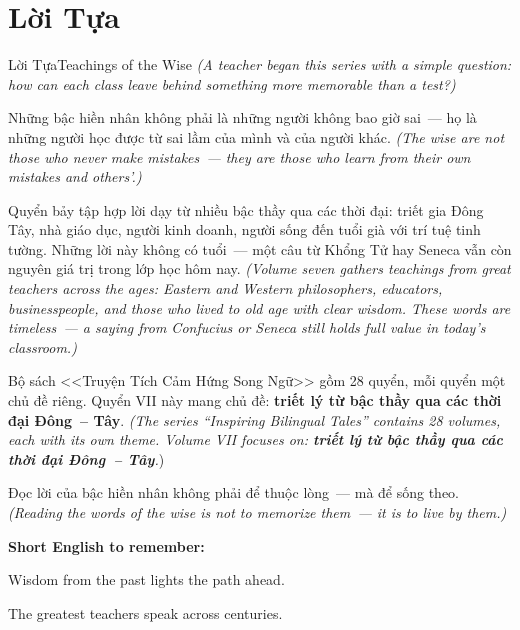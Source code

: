 \chapter*{Lời Tựa}

\begin{truyen}{Lời Tựa}{Teachings of the Wise}
\textit{(A teacher began this series with a simple question: how can each class leave behind something more memorable than a test?)}

Những bậc hiền nhân không phải là những người không bao giờ sai~--- họ là những người học được từ sai lầm của mình và của người khác.
\textit{(The wise are not those who never make mistakes~--- they are those who learn from their own mistakes and others'.)}

Quyển bảy tập hợp lời dạy từ nhiều bậc thầy qua các thời đại: triết gia Đông Tây, nhà giáo dục, người kinh doanh, người sống đến tuổi già với trí tuệ tinh tường. Những lời này không có tuổi~--- một câu từ Khổng Tử hay Seneca vẫn còn nguyên giá trị trong lớp học hôm nay.
\textit{(Volume seven gathers teachings from great teachers across the ages: Eastern and Western philosophers, educators, businesspeople, and those who lived to old age with clear wisdom. These words are timeless~--- a saying from Confucius or Seneca still holds full value in today's classroom.)}

Bộ sách <<Truyện Tích Cảm Hứng Song Ngữ>> gồm 28 quyển, mỗi quyển một chủ đề riêng. Quyển VII này mang chủ đề: \textbf{triết lý từ bậc thầy qua các thời đại Đông~-- Tây}.
\textit{(The series ``Inspiring Bilingual Tales'' contains 28 volumes, each with its own theme. Volume VII focuses on: \textbf{triết lý từ bậc thầy qua các thời đại Đông~-- Tây}.})
\end{truyen}

\begin{baihoc}
Đọc lời của bậc hiền nhân không phải để thuộc lòng~--- mà để sống theo.
\textit{(Reading the words of the wise is not to memorize them~--- it is to live by them.)}
\end{baihoc}

\begin{tcolorbox}[
  colback=truyenblue!6, colframe=truyenblue,
  coltitle=white, fonttitle=\bfseries,
  title={Easy English},
  arc=4pt, boxrule=1pt, breakable, enhanced
]
\textbf{Short English to remember:}

Wisdom from the past lights the path ahead.

The greatest teachers speak across centuries.
\end{tcolorbox}

